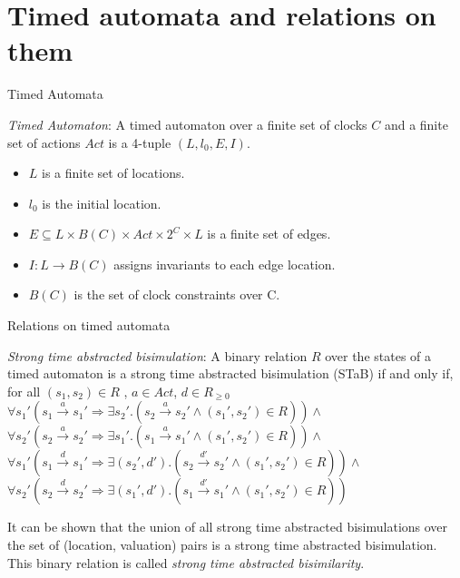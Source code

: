 \documentclass{beamer}
\begin{document}
\section{Timed automata and relations on them}

\begin{frame}{Timed Automata}
  \begin{definition}
    \emph{Timed Automaton}: A timed automaton
    \cite{Alur94atheory} over a finite set of clocks $C$
    and a finite set of actions $Act$ is a 4-tuple $(L, l_{0}, E, I)$.
    \begin{itemize}
    \item $L$ is a finite set of locations.
    \item $l_{0}$ is the initial location.
    \item $E \subseteq L \times B(C) \times Act \times 2^{C} \times L$
      is a finite set of edges.
    \item $I: L \rightarrow B(C)$ assigns invariants to each edge
      location.
    \item $B(C)$ is the set of clock constraints over C.
    \end{itemize}
  \end{definition}
\end{frame}

\begin{frame}{Relations on timed automata}
\begin{definition}  \label{def:stab} \emph{Strong time abstracted bisimulation}: A binary relation
  $R$ over the states of a timed automaton is a strong time abstracted
  bisimulation (STaB) if and only if, for all
  $(s_1, s_2) \in R$ , $a \in Act$, $d \in R_{\ge 0}$\\
  $\forall s_1' (s_1 \xrightarrow{a} s_1' \Rightarrow \exists s_2'
  . (s_2 \xrightarrow{a} s_2' \wedge (s_1', s_2') \in R ) )
  \wedge $ \\
  $\forall s_2' (s_2 \xrightarrow{a} s_2' \Rightarrow \exists s_1'
  . (s_1 \xrightarrow{a} s_1' \wedge (s_1', s_2') \in R ) ) \wedge $ \\
  $\forall s_1' (s_1 \xrightarrow{d} s_1' \Rightarrow \exists (s_2',
  d')
  . (s_2 \xrightarrow{d'} s_2' \wedge (s_1', s_2') \in R ) )
  \wedge $ \\
  $\forall s_2' (s_2 \xrightarrow{d} s_2' \Rightarrow \exists (s_1', d')
  . (s_1 \xrightarrow{d'} s_1' \wedge (s_1', s_2') \in R ) ) $ \\
\end{definition}

It can be shown that the union of all strong time abstracted
  bisimulations over the set of (location, valuation) pairs is a
  strong time abstracted bisimulation. This binary relation is called
  \textit{strong time abstracted bisimilarity}.
\end{frame}
\end{document}
